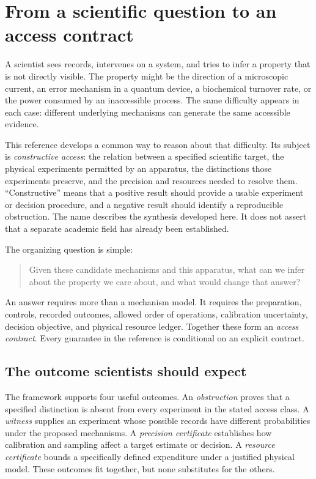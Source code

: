 \chapter{From a scientific question to an access contract}\label{entry:start}

A scientist sees records, intervenes on a system, and tries to infer a property that is not directly visible. The property might be the direction of a microscopic current, an error mechanism in a quantum device, a biochemical turnover rate, or the power consumed by an inaccessible process. The same difficulty appears in each case: different underlying mechanisms can generate the same accessible evidence.

This reference develops a common way to reason about that difficulty. Its subject is \emph{constructive access}: the relation between a specified scientific target, the physical experiments permitted by an apparatus, the distinctions those experiments preserve, and the precision and resources needed to resolve them. ``Constructive'' means that a positive result should provide a usable experiment or decision procedure, and a negative result should identify a reproducible obstruction. The name describes the synthesis developed here. It does not assert that a separate academic field has already been established.

The organizing question is simple:
\begin{quote}
Given these candidate mechanisms and this apparatus, what can we infer about the property we care about, and what would change that answer?
\end{quote}
An answer requires more than a mechanism model. It requires the preparation, controls, recorded outcomes, allowed order of operations, calibration uncertainty, decision objective, and physical resource ledger. Together these form an \emph{access contract}. Every guarantee in the reference is conditional on an explicit contract.

\section{The outcome scientists should expect}
The framework supports four useful outcomes. An \emph{obstruction} proves that a specified distinction is absent from every experiment in the stated access class. A \emph{witness} supplies an experiment whose possible records have different probabilities under the proposed mechanisms. A \emph{precision certificate} establishes how calibration and sampling affect a target estimate or decision. A \emph{resource certificate} bounds a specifically defined expenditure under a justified physical model. These outcomes fit together, but none substitutes for the others.

